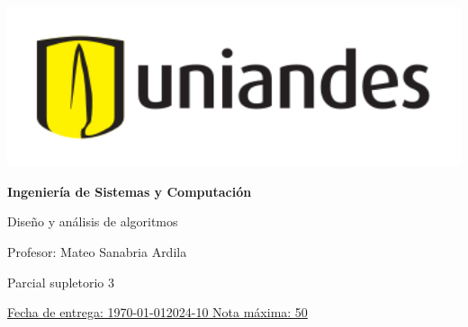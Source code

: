 \documentclass[12pt, a4paper]{exam}
\begin{document}
	\noindent
	\begin{minipage}[l]{0.1\textwidth}
		\noindent
		\includegraphics[width=1.8\textwidth]{Logosimbolo-uniandes_horizontal.png}
	\end{minipage}
\hfill
\begin{minipage}[c]{0.8\textwidth}
	\begin{center}
		{\large \textbf{Ingeniería de Sistemas y Computación} \par
		\large	Diseño y análisis de algoritmos	\par
		\small  Profesor: Mateo Sanabria Ardila	\par
		\small  Parcial supletorio 3	\par
		}
	\end{center}
\end{minipage}
\par
\vspace{0.2in}
\noindent
\uline{Fecha de entrega: \today 	\hfill  2024-10		\hfill Nota máxima: 50}
\par 
\vspace{0.15in}
\end{document}
